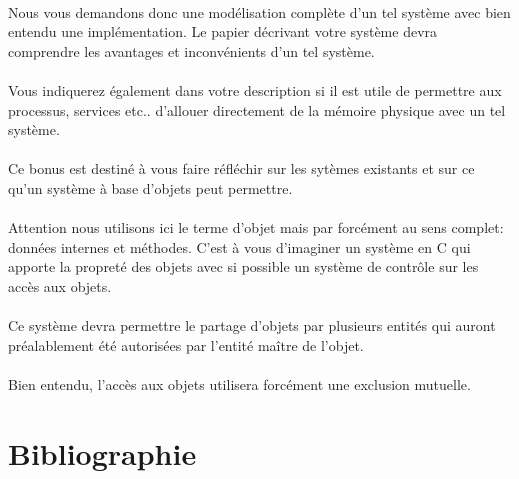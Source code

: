 \documentclass[10pt,a4wide]{article}
\begin{document}
\paragraph{}

Nous vous demandons donc une mod\'elisation compl\`ete d'un tel syst\`eme
avec bien entendu une impl\'ementation. Le papier d\'ecrivant votre
syst\`eme devra comprendre les avantages et inconv\'enients d'un tel
syst\`eme.

\paragraph{}

Vous indiquerez \'egalement dans votre description si il est utile de
permettre aux processus, services etc.. d'allouer directement de la
m\'emoire physique avec un tel syst\`eme.

\paragraph{}

Ce bonus est destin\'e \`a vous faire r\'efl\'echir sur les syt\`emes
existants et sur ce qu'un syst\`eme \`a base d'objets peut permettre.

\paragraph{}

Attention nous utilisons ici le terme d'objet mais par forc\'ement au sens
complet: donn\'ees internes et m\'ethodes. C'est \`a vous d'imaginer un
syst\`eme en C qui apporte la propret\'e des objets avec si possible
un syst\`eme de contr\^ole sur les acc\`es aux objets.

\paragraph{}

Ce syst\`eme devra permettre le partage d'objets par plusieurs entit\'es
qui auront pr\'ealablement \'et\'e autoris\'ees par l'entit\'e ma\^itre de
l'objet.

\paragraph{}

Bien entendu, l'acc\`es aux objets utilisera forc\'ement une
exclusion mutuelle.

\section{Bibliographie}
\end{document}
